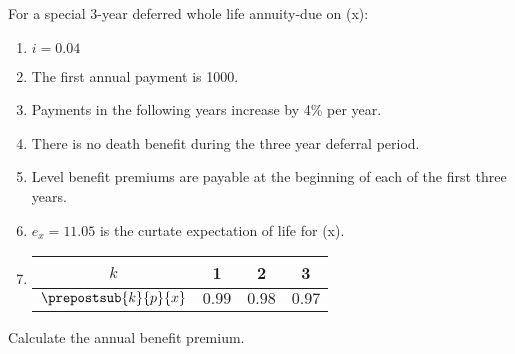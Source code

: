 For a special 3-year deferred whole life annuity-due on (x):
\begin{enumerate}
\item $i = 0.04$
\item The first annual payment is 1000.
\item Payments in the following years increase by 4\% per year.
\item There is no death benefit during the three year deferral period.
\item Level benefit premiums are payable at the beginning of each of the 
  first three years.
\item $e_x =11.05$ is the curtate expectation of life for (x).
\item \begin{tabular}{c|c|c|c}
       $k$                    & 1 & 2 & 3 \\ \hline
       $\prepostsub{k}{p}{x}$ & $0.99$ & $0.98$ & $0.97$ 
      \end{tabular}
\end{enumerate}
Calculate the annual benefit premium.
\showsol{\bsoln \esoln}
